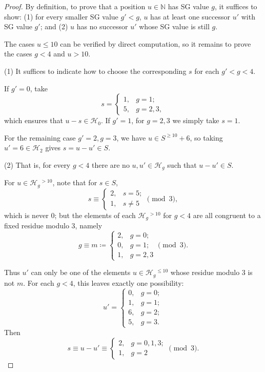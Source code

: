 \documentclass[10pt,a4paper]{amsart}
\begin{document}
\begin{proof}
    By definition, to prove that a position $u\in\mathbb{N}$ has SG value $g$, it suffices to show:
    (1) for every smaller SG value $g'<g$, $u$ has at least one successor $u'$ with SG value $g'$; and
    (2) $u$ has no successor $u'$ whose SG value is still $g$.

    The cases $u\leq 10$ can be verified by direct computation, so it remains to prove the cases $g<4$ and $u>10$.

    (1) It suffices to indicate how to choose the corresponding $s$ for each $g'<g<4$.

    If $g'=0$, take
    \[
        s=
        \begin{cases}
            1, & g=1; \\
            5, & g=2,3,
        \end{cases}
    \]
    which ensures that $u-s\in \mathcal{H}_0$.
    If $g'=1$, for $g=2,3$ we simply take $s=1$.

    For the remaining case $g'=2, g=3$, we have $u\in S^{\geq 10}+6$, so taking $u'=6\in\mathcal{H}_2$ gives $s=u-u'\in S$.

    (2) That is, for every $g<4$ there are no $u,u'\in\mathcal{H}_g$ such that $u-u'\in S$.

    For $u\in\mathcal{H}_g{}^{>10}$, note that for $s\in S$,
    \[
        s\equiv
        \begin{cases}
            2, & s=5; \\
            1, & s\neq 5
        \end{cases}
        \pmod 3,
    \]
    which is never $0$; but the elements of each $\mathcal{H}_g{}^{>10}$ for $g<4$ are all congruent to a fixed residue modulo $3$, namely
    \[
        g \equiv m \coloneqq
        \begin{cases}
            2, & g=0; \\
            0, & g=1; \\
            1, & g=2,3
        \end{cases}
        \pmod 3.
    \]

    Thus $u'$ can only be one of the elements $u\in\mathcal{H}_g{}^{\leq 10}$ whose residue modulo $3$ is not $m$.
    For each $g<4$, this leaves exactly one possibility:
    \[
        u'=
        \begin{cases}
            0, & g=0; \\
            1, & g=1; \\
            6, & g=2; \\
            5, & g=3.
        \end{cases}
    \]
    Then
    \[
        s\equiv u-u' \equiv
        \begin{cases}
            2, & g=0,1,3;\\
            1, & g=2
        \end{cases}
        \pmod 3.
    \]


\end{proof}
\end{document}
